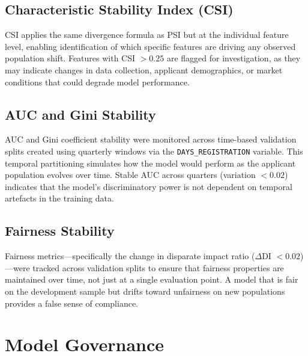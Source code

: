 

\subsection{Characteristic Stability Index (CSI)}

CSI applies the same divergence formula as PSI but at the individual feature level, enabling identification of which specific features are driving any observed population shift. Features with CSI $> 0.25$ are flagged for investigation, as they may indicate changes in data collection, applicant demographics, or market conditions that could degrade model performance.

\subsection{AUC and Gini Stability}

AUC and Gini coefficient stability were monitored across time-based validation splits created using quarterly windows via the \texttt{DAYS\_REGISTRATION} variable. This temporal partitioning simulates how the model would perform as the applicant population evolves over time. Stable AUC across quarters (variation $< 0.02$) indicates that the model's discriminatory power is not dependent on temporal artefacts in the training data.

\subsection{Fairness Stability}

Fairness metrics---specifically the change in disparate impact ratio ($\Delta$DI $< 0.02$)---were tracked across validation splits to ensure that fairness properties are maintained over time, not just at a single evaluation point. A model that is fair on the development sample but drifts toward unfairness on new populations provides a false sense of compliance.

\section{Model Governance}
\label{sec:governance}


